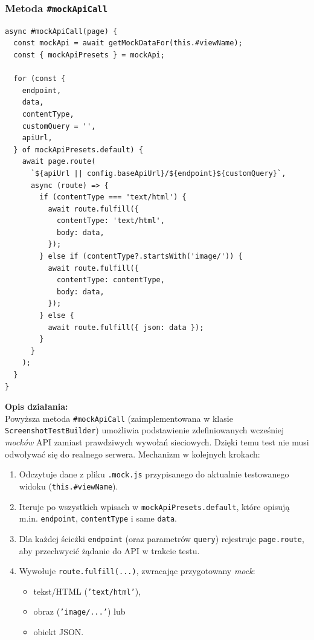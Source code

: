 \documentclass[12pt]{report}
\begin{document}
\subsubsection{Metoda \texttt{\#mockApiCall}}
\label{sec:mockApiCall}

\begin{verbatim}
async #mockApiCall(page) {
  const mockApi = await getMockDataFor(this.#viewName);
  const { mockApiPresets } = mockApi;

  for (const {
    endpoint,
    data,
    contentType,
    customQuery = '',
    apiUrl,
  } of mockApiPresets.default) {
    await page.route(
      `${apiUrl || config.baseApiUrl}/${endpoint}${customQuery}`,
      async (route) => {
        if (contentType === 'text/html') {
          await route.fulfill({
            contentType: 'text/html',
            body: data,
          });
        } else if (contentType?.startsWith('image/')) {
          await route.fulfill({
            contentType: contentType,
            body: data,
          });
        } else {
          await route.fulfill({ json: data });
        }
      }
    );
  }
}
\end{verbatim}

\noindent
\textbf{Opis działania:}\\
Powyższa metoda \verb|#mockApiCall| (zaimplementowana w klasie \verb|ScreenshotTestBuilder|) umożliwia podstawienie zdefiniowanych wcześniej \textit{mocków} API zamiast prawdziwych wywołań sieciowych. Dzięki temu test nie musi odwoływać się do realnego serwera. Mechanizm w kolejnych krokach:

\begin{enumerate}
  \item Odczytuje dane z pliku \verb|.mock.js| przypisanego do aktualnie testowanego widoku (\verb|this.#viewName|).
  \item Iteruje po wszystkich wpisach w \verb|mockApiPresets.default|, które opisują m.in. \verb|endpoint|, \verb|contentType| i same \verb|data|.
  \item Dla każdej ścieżki \verb|endpoint| (oraz parametrów \verb|query|) rejestruje \texttt{page.route}, aby przechwycić żądanie do API w trakcie testu.
  \item Wywołuje \verb|route.fulfill(...)|, zwracając przygotowany \textit{mock}:
    \begin{itemize}
      \item tekst/HTML (\texttt{'text/html'}),
      \item obraz (\texttt{'image/...'}) lub
      \item obiekt JSON.
    \end{itemize}
\end{enumerate}
\end{document}
